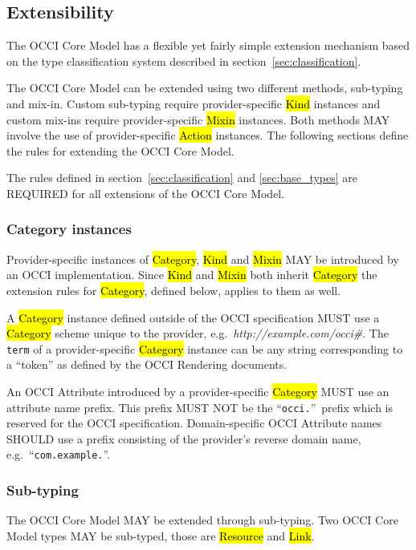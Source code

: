 \documentclass[10pt,a4paper]{article}
\begin{document}
\subsection{Extensibility}
\label{sec:extensibility}
The OCCI Core Model has a flexible yet fairly simple extension
mechanism based on the type classification system described in
section~\ref{sec:classification}.

The OCCI Core Model can be extended using two different methods,
sub-typing and mix-in. Custom sub-typing require provider-specific
\hl{Kind} instances and custom mix-ins require provider-specific
\hl{Mixin} instances.  Both methods MAY involve the use of
provider-specific \hl{Action} instances.
The following sections
define the rules for extending the OCCI Core Model.

The rules defined in section~\ref{sec:classification} and
\ref{sec:base_types} are REQUIRED for all extensions of the OCCI Core
Model.

\subsubsection{Category instances}
\label{sec:ext:category}
Provider-specific instances of \hl{Category}, \hl{Kind} and \hl{Mixin}
MAY be introduced by an OCCI implementation. Since \hl{Kind} and
\hl{Mixin} both inherit \hl{Category} the extension rules for
\hl{Category}, defined below, applies to them as well.

A \hl{Category} instance defined outside of the OCCI specification
MUST use a \hl{Category} scheme unique to the provider,
e.g.~\textit{http://example.com/occi\#}. The {\tt term} of a
provider-specific \hl{Category} instance can be any string
corresponding to a ``token'' as defined by the OCCI Rendering documents.

An OCCI Attribute introduced by a provider-specific \hl{Category} MUST use
an attribute name prefix. This prefix MUST NOT be the
``\texttt{occi.}''~prefix which is reserved for the OCCI
specification. Domain-specific OCCI Attribute names SHOULD use a prefix
consisting of the provider's reverse domain name,
e.g.~``\texttt{com.example.}''.

\subsubsection{Sub-typing}
The OCCI Core Model MAY be extended through sub-typing.  Two OCCI
Core Model types MAY be sub-typed, those are \hl{Resource} and \hl{Link}.
\end{document}

